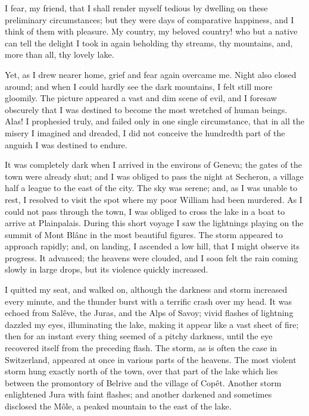 I fear, my friend, that I shall render
myself tedious by dwelling on these
preliminary circumstances; but they
were days of comparative happiness,
and I think of them with pleasure. My
country, my beloved country! who but
a native can tell the delight I took in
again beholding thy streams, thy mountains,
and, more than all, thy lovely lake.

Yet, as I drew nearer home, grief
and fear again overcame me. Night
also closed around; and when I could
hardly see the dark mountains, I felt
still more gloomily. The picture appeared
a vast and dim scene of evil,
and I foresaw obscurely that I was destined
to become the most wretched of
human beings. Alas! I prophesied
truly, and failed only in one single
circumstance, that in all the misery I
imagined and dreaded, I did not conceive
the hundredth part of the anguish
I was destined to endure.

It was completely dark when I arrived
in the environs of Geneva; the
gates of the town were already shut;
and I was obliged to pass the night at
Secheron, a village half a league to the
east of the city. The sky was serene;
and, as I was unable to rest, I resolved
to visit the spot where my poor William
had been murdered. As I could not
pass through the town, I was obliged
to cross the lake in a boat to arrive at
Plainpalais. During this short voyage
I saw the lightnings playing on the
summit of Mont Blânc in the most
beautiful figures. The storm appeared
to approach rapidly; and, on landing,
I ascended a low hill, that I might observe
its progress. It advanced; the
heavens were clouded, and I soon felt
the rain coming slowly in large drops,
but its violence quickly increased.

I quitted my seat, and walked on,
although the darkness and storm
increased every minute, and the thunder
burst with a terrific crash over my
head. It was echoed from Salêve, the
Juras, and the Alps of Savoy; vivid
flashes of lightning dazzled my eyes,
illuminating the lake, making it appear
like a vast sheet of fire; then for
an instant every thing seemed of a
pitchy darkness, until the eye recovered
itself from the preceding flash. The
storm, as is often the case in Switzerland,
appeared at once in various parts
of the heavens. The most violent
storm hung exactly north of the town,
over that part of the lake which lies
between the promontory of Belrive
and the village of Copêt. Another
storm enlightened Jura with faint
flashes; and another darkened and
sometimes disclosed the Môle, a peaked
mountain to the east of the lake.

